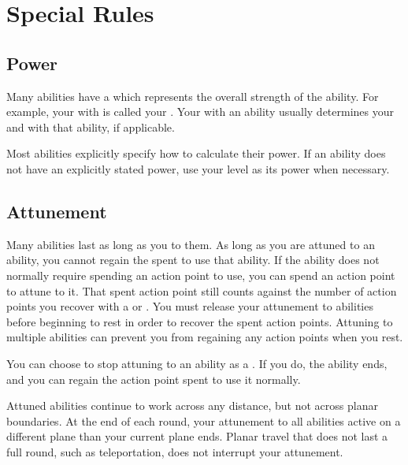 \section{Special Rules}

    \subsection{Power}\label{Power}
        Many abilities have a  which represents the overall strength of the ability.
        For example, your  with  is called your .
        Your  with an ability usually determines your  and  with that ability, if applicable.

        Most abilities explicitly specify how to calculate their power.
        If an ability does not have an explicitly stated power, use your level as its power when necessary.

    \subsection{Attunement}\label{Attunement}
        Many abilities last as long as you  to them.
        As long as you are attuned to an ability, you cannot regain the  spent to use that ability.
        If the ability does not normally require spending an action point to use, you can spend an action point to attune to it.
        That spent action point still counts against the number of action points you recover with a  or .
        You must release your attunement to abilities before beginning to rest in order to recover the spent action points.
        Attuning to multiple abilities can prevent you from regaining any action points when you rest.

        You can choose to stop attuning to an ability as a .
        If you do, the ability ends, and you can regain the action point spent to use it normally.

        Attuned abilities continue to work across any distance, but not across planar boundaries.
        At the end of each round, your attunement to all abilities active on a different plane than your current plane ends.
        Planar travel that does not last a full round, such as teleportation, does not interrupt your attunement.

